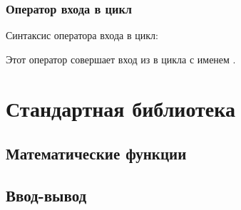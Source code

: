 \documentclass[10pt]{report}
\begin{document}
 \subsection{Оператор входа в цикл}

Синтаксис оператора входа в цикл:
\begin{center}
\textcolor{Green}{}
\end{center}
Этот оператор совершает вход из в цикла с именем \textcolor{Green}{}.


         
\chapter{Стандартная библиотека}
    \section{Математические функции}
    \section{Ввод-вывод}
\end{document}
